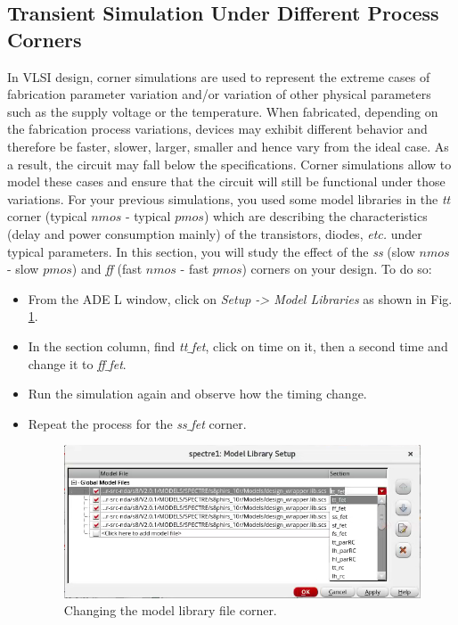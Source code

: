 \subsection{Transient Simulation Under Different Process Corners}	
In VLSI design, corner simulations are used to represent the extreme cases of fabrication parameter variation and/or variation of other physical parameters such as the supply voltage or the temperature. When fabricated, depending on the fabrication process variations, devices may exhibit different behavior and therefore be faster, slower, larger, smaller and hence vary from the ideal case. As a result, the circuit may fall below the specifications. Corner simulations allow to model these cases and ensure that the circuit will still be functional under those variations. For your previous simulations, you used some model libraries in the \textit{tt} corner (typical $nmos$ - typical $pmos$) which are describing the characteristics (delay and power consumption mainly) of the transistors, diodes, \textit{etc.} under typical parameters. In this section, you will study the effect of the \textit{ss} (slow $nmos$ - slow $pmos$) and \textit{ff} (fast $nmos$ - fast $pmos$) corners on your design. To do so:	

\begin{itemize}
	\item From the ADE L window, click on \textit{Setup -> Model Libraries} as shown in Fig. \ref{fig_corner}.
	\item In the section column, find \textit{tt$\_$fet}, click on time on it, then a second time and change it to \textit{ff$\_$fet}.
	\item Run the simulation again and observe how the timing change.
	\item Repeat the process for the \textit{ss$\_$fet} corner.
	\begin{figure}[!h]
		\centering
		\includegraphics[scale=0.35]{figures/lab1_schematic_sim/tt}
		\caption{Changing the model library file corner.}
		\label{fig_corner}
	\end{figure}	
\end{itemize}

